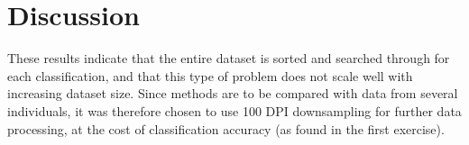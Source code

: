 \section{Discussion}
These results indicate that the entire dataset is sorted and searched through for
each classification, and that this type of problem does not scale well with increasing
dataset size.
Since methods are to be compared with data from several individuals,
it was therefore chosen to use 100 DPI downsampling for further data processing,
at the cost of classification accuracy (as found in the first exercise).